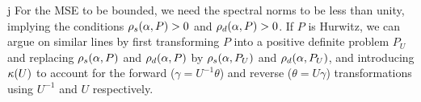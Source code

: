 \begin{comment}
The output $\thh_t$ of the algorithm \eqref{eq:lsa} is the average of the internal states at times $s=0,\ldots,t-1$. The error dynamics of the internal states by looking at the behavior of $e_t\eqdef \theta_t-\ts$.
\begin{align}\label{eq:errec}
\theta_t&=\theta_{t-1}+\alpha(b_t-A_t\theta_{t-1})\nn\\
\theta_t-\ts&=\theta_{t-1}-\ts+\alpha\left(b_t-A_t(\theta_{t-1}-\ts+\ts)\right)\nn\\
e_t&=e_{t-1}+\alpha(b_t-A_t e_t -A_t\ts)\nn\\
e_t&=\underbrace{((I-\alpha A_t))}_{\text{Random-Matrix}} e_{t-1}+\underbrace{\alpha(N_t -(M_t)\ts)}_{\text{Noise}}
\end{align}
From \eqref{errec} it is clear that the error dynamics depends on the $i)$ properties of the random matrix, $ii)$ properties of the noise. In the absence of the noise term in \eqref{eq:errec}, we have $e_t=(I-\alpha A_t) e_{t-1}=\Pi_{s=1}(I-\alpha A_s) e_0$, i.e., the initial error is get multiplied by a product of random matrices. In such a scenario, we can guess that whether or not the algorithm forgets the bias $\norm{\theta_0-\ts}$, depends on whether the matrix product is contracting. One way to characterize this contracting property is to look at the spectral radius of the random matrix, which is given by $\EE{\norm{I-\alpha A_t}^2}=1-\alpha \rhos{P},  {\norm{I-\alpha A_P}^2}=1-\alpha \rhod{P}\,,$
\end{comment}
\begin{comment}
\begin{align}\label{eq:spectralrand}
\EE{\norm{I-\alpha A_t}^2}=1-\alpha \rhos{P}, \quad  {\norm{I-\alpha A_P}^2}=1-\alpha \rhod{P}\,,
\end{align}
\end{comment}
j%
For the MSE to be bounded, we need the spectral norms to be less than unity, implying the conditions $\rho_s(\alpha,P)>0$ and $\rho_d(\alpha,P)>0$. 
If $P$ is Hurwitz, we can argue on similar lines by first transforming $P$ into a positive definite problem $P_U$ and replacing $\rho_s(\alpha,P)$ and $\rho_d(\alpha,P)$ by $\rho_s(\alpha,P_U)$ and $\rho_d(\alpha,P_U)$, and introducing $\kappa(U)$ to account for the forward ($\gamma=U^{-1}\theta$) and reverse ($\theta=U\gamma$) transformations using $U^{-1}$ and $U$ respectively.

